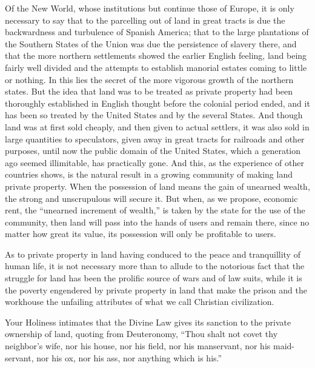 \documentclass{book}
\begin{document}
Of the New World, whose institutions but continue those of Europe, it is only necessary to say that to the parcelling out of land in great tracts is due the backwardness and turbulence of Spanish America; that to the large plantations of the Southern States of the Union was due the persistence of slavery there, and that the more northern settlements showed the earlier English feeling, land being fairly well divided and the attempts to establish manorial estates coming to little or nothing. In this lies the secret of the more vigorous growth of the northern states. But the idea that land was to be treated as private property had been thoroughly established in English thought before the colonial period ended, and it has been so treated by the United States and by the several States. And though land was at first sold cheaply, and then given to actual settlers, it was also sold in large quantities to speculators, given away in great tracts for railroads and other purposes, until now the public domain of the United States, which a generation ago seemed illimitable, has practically gone. And this, as the experience of other countries shows, is the natural result in a growing community of making land private property. When the possession of land means the gain of unearned wealth, the strong and unscrupulous will secure it. But when, as we propose, economic rent, the “unearned increment of wealth,” is taken by the state for the use of the community, then land will pass into the hands of users and remain there, since no matter how great its value, its possession will only be profitable to users.

As to private property in land having conduced to the peace and tranquillity of human life, it is not necessary more than to allude to the notorious fact that the struggle for land has been the prolific source of wars and of law suits, while it is the poverty engendered by private property in land that make the prison and the workhouse the unfailing attributes of what we call Christian civilization.

Your Holiness intimates that the Divine Law gives its sanction to the private ownership of land, quoting from Deuteronomy, “Thou shalt not covet thy neighbor’s wife, nor his house, nor his field, nor his manservant, nor his maid-servant, nor his ox, nor his ass, nor anything which is his.”
\end{document}
